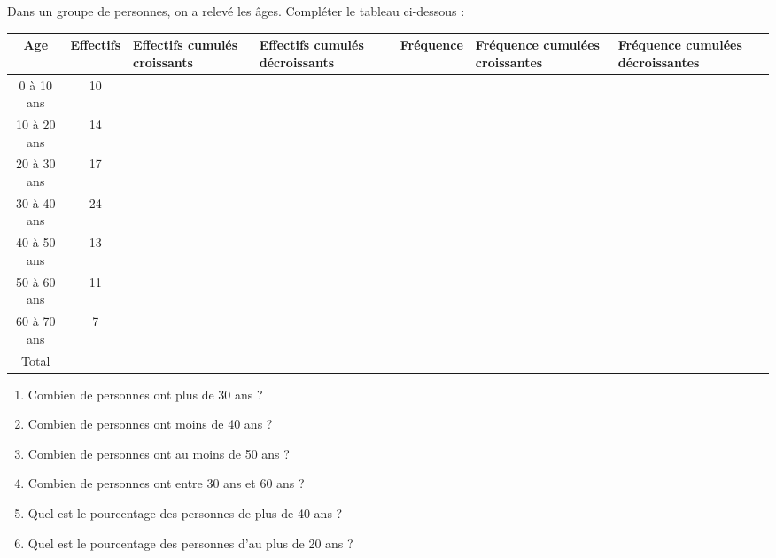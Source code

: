 
Dans un groupe de personnes, on a relevé les âges. Compléter le tableau ci-dessous :


\begin{tabular}{|c|c|>{\centering\arraybackslash}p{2cm}|>{\centering\arraybackslash}p{2cm}|>{\centering\arraybackslash}p{2cm}|>{\centering\arraybackslash}p{2cm}|>{\centering\arraybackslash}p{2cm}|}
\hline 
Age & Effectifs & Effectifs
cumulés
croissants & Effectifs
cumulés décroissants & Fréquence & Fréquence
cumulées croissantes & Fréquence
cumulées décroissantes \\ 
\hline 
0 à 10 ans & 10 &  &  &  &  &  \\ 
\hline 
10 à 20 ans & 14 &  &  &  &  &  \\ 
\hline 
20 à 30 ans & 17 &  &  &  &  &  \\ 
\hline 
30 à 40 ans & 24 &  &  &  &  &  \\ 
\hline 
40 à 50 ans & 13 & &  &  &  &  \\ 
\hline
50 à 60 ans & 11 & &  &  &  &  \\ 
\hline 
60 à 70 ans & 7 &  &  &  &  &  \\ 
\hline 
Total &  &  &  &  &  &  \\ 
\hline 
\end{tabular} 

\begin{enumerate}
\item Combien de personnes ont plus de 30 ans ?
\item Combien de personnes ont moins de 40 ans ? 
\item Combien de personnes ont au moins de 50 ans ? 
\item Combien de personnes ont entre 30 ans et 60 ans ?
\item Quel est le pourcentage des personnes de plus de 40 ans ?
\item Quel est le pourcentage des personnes d'au plus de 20 ans ?
\end{enumerate}
